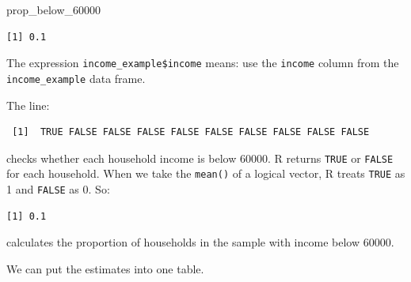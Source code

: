 \documentclass[
  letterpaper,
  DIV=11,
  numbers=noendperiod]{scrreprt}
\newenvironment{Shaded}{\begin{snugshade}}{\end{snugshade}}
\newcommand{\DecValTok}[1]{\textcolor[rgb]{0.68,0.00,0.00}{#1}}
\newcommand{\FunctionTok}[1]{\textcolor[rgb]{0.28,0.35,0.67}{#1}}
\newcommand{\NormalTok}[1]{\textcolor[rgb]{0.00,0.23,0.31}{#1}}
\newcommand{\SpecialCharTok}[1]{\textcolor[rgb]{0.37,0.37,0.37}{#1}}
\begin{document}
\begin{Shaded}
\begin{Highlighting}[]
\NormalTok{prop\_below\_60000}
\end{Highlighting}
\end{Shaded}

\begin{verbatim}
[1] 0.1
\end{verbatim}

The expression \texttt{income\_example\$income} means: use the
\texttt{income} column from the \texttt{income\_example} data frame.

The line:

\begin{Shaded}
\end{Shaded}

\begin{verbatim}
 [1]  TRUE FALSE FALSE FALSE FALSE FALSE FALSE FALSE FALSE FALSE
\end{verbatim}

checks whether each household income is below 60000. R returns
\texttt{TRUE} or \texttt{FALSE} for each household. When we take the
\texttt{mean()} of a logical vector, R treats \texttt{TRUE} as 1 and
\texttt{FALSE} as 0. So:

\begin{Shaded}
\end{Shaded}

\begin{verbatim}
[1] 0.1
\end{verbatim}

calculates the proportion of households in the sample with income below
60000.

We can put the estimates into one table.

\begin{table}

\caption{\label{tbl-r-point-estimates}Point estimates from the household
income sample}


\end{table}%
\end{document}
